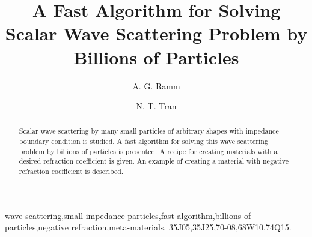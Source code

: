 \documentclass[12pt]{elsarticle}
\title{A Fast Algorithm for Solving Scalar Wave Scattering Problem by Billions of Particles}
\author[ar]{A. G. Ramm \corref{cor1}}
\author[nt]{N. T. Tran}
\date{}
\numberwithin{equation}{section}
\begin{document}
\begin{keyword}
wave scattering\sep small impedance particles\sep fast algorithm\sep billions of particles\sep negative refraction\sep meta-materials.
\MSC 35J05\sep 35J25\sep 70-08\sep 68W10\sep 74Q15.
\end{keyword}

\begin{abstract}
Scalar wave scattering by many small particles of arbitrary shapes
with impedance boundary condition is studied. A fast algorithm for solving this
wave scattering problem by billions of particles is presented. A recipe for
creating materials with a desired refraction coefficient is given. An example
of creating a material with negative refraction coefficient is described.
\end{abstract}

\maketitle
\end{document}
